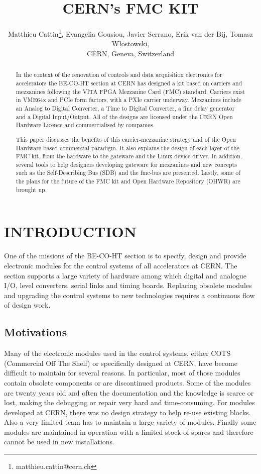 \documentclass{JAC2003}
\begin{document}
\title{CERN's FMC KIT}

\author{Matthieu Cattin\thanks{matthieu.cattin@cern.ch}, Evangelia Gousiou, Javier Serrano, Erik van der Bij, Tomasz W\l{}ostowski,\\
CERN, Geneva, Switzerland}

\maketitle

\begin{abstract}
  In the context of the renovation of controls and data acquisition electronics for accelerators the BE-CO-HT section at CERN has designed a kit based on carriers and mezzanines following the VITA FPGA Mezzanine Card (FMC) standard. Carriers exist in VME64x and PCIe form factors, with a PXIe carrier underway. Mezzanines include an Analog to Digital Converter, a Time to Digital Converter, a fine delay generator and a Digital Input/Output. All of the designs are licensed under the CERN Open Hardware Licence and commercialised by companies.

This paper discusses the benefits of this carrier-mezzanine strategy and of the Open Hardware based commercial paradigm.
It also explains the design of each layer of the FMC kit, from the hardware to the gateware and the Linux device driver.
In addition, several tools to help designers developing gateware for mezzanines and new concepts such as the Self-Describing Bus (SDB) and the fmc-bus are presented.
Lastly, some of the plans for the future of the FMC kit and Open Hardware Repository (OHWR) are brought up.
\end{abstract}


\section{INTRODUCTION}
One of the missions of the BE-CO-HT section is to specify, design and provide electronic modules for the control systems of all accelerators at CERN.
The section supports a large variety of hardware among which digital and analogue I/O, level converters, serial links and timing boards.
Replacing obsolete modules and upgrading the control systems to new technologies requires a continuous flow of design work.

\subsection{Motivations}
Many of the electronic modules used in the control systems, either COTS (Commercial Off The Shelf) or specifically designed at CERN, have become difficult to maintain for several reasons.
In particular, most of those modules contain obsolete components or are discontinued products.
Some of the modules are twenty years old and often the documentation and the knowledge is scarce or lost, making the debugging or repair very hard and time-consuming.
For modules developed at CERN, there was no design strategy to help re-use existing blocks.
Also a very limited team has to maintain a large variety of modules.
Finally some modules are maintained in operation with a limited stock of spares and therefore cannot be used in new installations.
\end{document}
